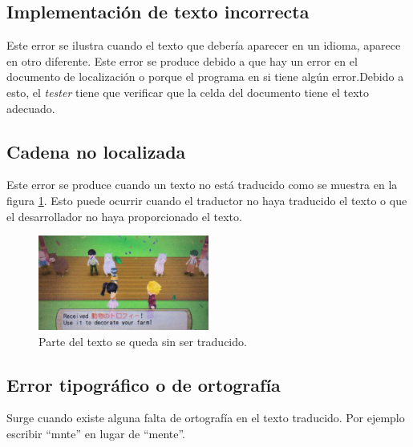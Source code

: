 \subsection{Implementación de texto incorrecta}\label{ErrorImpIncorrecta}
Este error se ilustra cuando el texto que debería aparecer en un idioma, aparece en otro diferente. Este error se produce debido a que hay un error en el documento de localización o porque el programa en si tiene algún error.Debido a esto, el \textit{tester} tiene que verificar que la celda del documento tiene el
texto adecuado.
\subsection{Cadena no localizada}\label{ErrorNoLocalizada}
Este error se produce cuando un texto no está traducido como se muestra en la figura \ref{fig:EImplementacion_Incorrecta}. Esto puede ocurrir cuando el traductor no haya traducido el texto o que el desarrollador no haya proporcionado el texto. 
\begin{figure}[H]
	\centering
	\includegraphics[width = 0.5\textwidth]{Imagenes/Errores_Localizacion/E_Implementacion_Incorrecta.png}
	\caption{Parte del texto se queda sin ser traducido.}
	\label{fig:EImplementacion_Incorrecta}
\end{figure}

\subsection{Error tipográfico o de ortografía}\label{ErrorTypo}
Surge cuando existe alguna falta de ortografía en el texto traducido. Por ejemplo escribir ``mnte'' en lugar de ``mente''.

